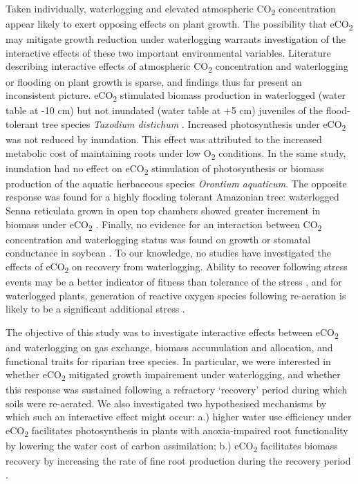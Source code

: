 \documentclass[12pt,a4paper]{memoir}
\begin{document}
Taken individually, waterlogging and elevated atmospheric CO\textsubscript{2} concentration appear likely to exert opposing effects on plant growth. The possibility that eCO\textsubscript{2} may mitigate growth reduction under waterlogging warrants investigation of the interactive effects of these two important environmental variables. Literature describing interactive effects of atmospheric CO\textsubscript{2} concentration and waterlogging or flooding on plant growth is sparse, and findings thus far present an inconsistent picture. eCO\textsubscript{2} stimulated biomass production in waterlogged (water table at -10 cm) but not inundated (water table at +5 cm) juveniles of the flood-tolerant tree species \textit{Taxodium distichum} \citep{Megonigal2005}. Increased photosynthesis under eCO\textsubscript{2} was not reduced by inundation. This effect was attributed to the increased metabolic cost of maintaining roots under low O\textsubscript{2} conditions. In the same study, inundation had no effect on eCO\textsubscript{2} stimulation of photosynthesis or biomass production of the aquatic herbaceous species \textit{Orontium aquaticum}.  The opposite response was found for a highly flooding tolerant Amazonian tree: waterlogged Senna reticulata grown in open top chambers showed greater increment in biomass under eCO\textsubscript{2} \citep{Arenque2014}. Finally, no evidence for an interaction between CO\textsubscript{2} concentration and waterlogging status was found on growth or stomatal conductance in soybean \citep{Shimono2012}. To our knowledge, no studies have investigated the effects of eCO\textsubscript{2} on recovery from waterlogging. Ability to recover following stress events may be a better indicator of fitness than tolerance of the stress \citep{Gutschick2003}, and for waterlogged plants, generation of reactive oxygen species following re-aeration is likely to be a significant additional stress \citep{Drew1997}. 

The objective of this study was to investigate interactive effects between eCO\textsubscript{2} and waterlogging on gas exchange, biomass accumulation and allocation, and functional traits for riparian tree species. In particular, we were interested in whether eCO\textsubscript{2} mitigated growth impairement under waterlogging, and whether this response was sustained following a refractory ‘recovery’ period during which soils were re-aerated. We also investigated two hypothesised mechanisms by which such an interactive effect might occur: a.) higher water use efficiency under eCO\textsubscript{2} \citep{Holtum2010} facilitates photosynthesis in plants with anoxia-impaired root functionality by lowering the water cost of carbon assimilation; b.) eCO\textsubscript{2} facilitates biomass recovery by increasing the rate of fine root production during the recovery period \citep{Pregitzer1995}.  \clearpage
\end{document}
